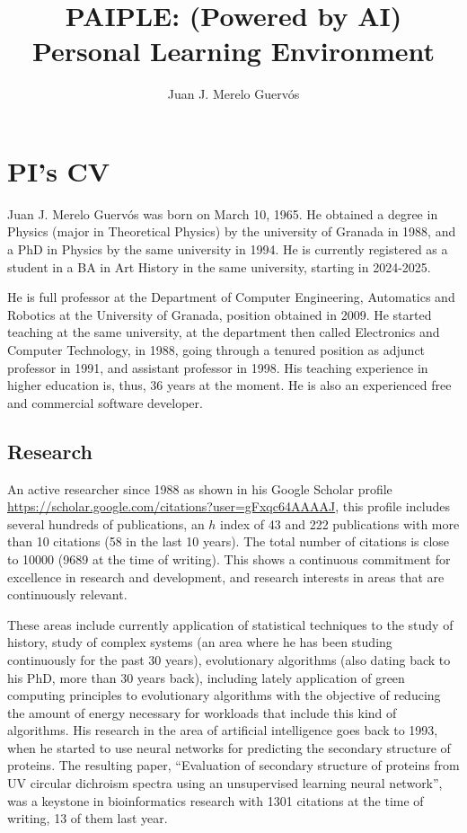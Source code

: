 \documentclass[a4paper,12pt]{article}
\title{PAIPLE: (Powered by AI) Personal Learning Environment}
\author{Juan J. Merelo Guervós}
\date{}
\begin{document}
\maketitle

\section{PI's CV}

Juan J. Merelo Guervós was born on March 10, 1965. He obtained a degree in Physics (major in Theoretical Physics) by the university of Granada in 1988, and a PhD in Physics by the same university in 1994. He is currently registered as a student in a BA in Art History in the same university, starting in 2024-2025.

He is full professor at the Department of Computer Engineering, Automatics and
Robotics at the University of Granada, position obtained in 2009. He started
teaching at the same university, at the department then called Electronics and
Computer Technology, in 1988, going through a tenured position as adjunct
professor in 1991, and assistant professor in 1998. His teaching experience in
higher education is, thus, 36 years at the moment. He is also an experienced
free and commercial software developer.


\subsection{Research}

An active researcher since 1988 as shown in his Google Scholar profile \url{https://scholar.google.com/citations?user=gFxqc64AAAAJ}, this profile includes several hundreds of publications, an $h$ index of 43 and 222 publications with more than 10 citations (58 in the last 10 years). The total number of citations is close to 10000 (9689 at the time of writing). This shows a continuous commitment for excellence in research and development, and research interests in areas that are continuously relevant.

These areas include currently application of statistical techniques to the study of history, study of complex systems (an area where he has been studing continuously for the past 30 years), evolutionary algorithms (also dating back to his PhD, more than 30 years back), including lately application of green computing principles to evolutionary algorithms with the objective of reducing the amount of energy necessary for workloads that include this kind of algorithms. His research in the area of artificial intelligence goes back to 1993, when he started to use neural networks for predicting the secondary structure of proteins. The resulting paper, ``Evaluation of secondary structure of proteins from UV circular dichroism spectra using an unsupervised learning neural network'', was a keystone in bioinformatics research with 1301 citations at the time of writing, 13 of them last year.
\end{document}
